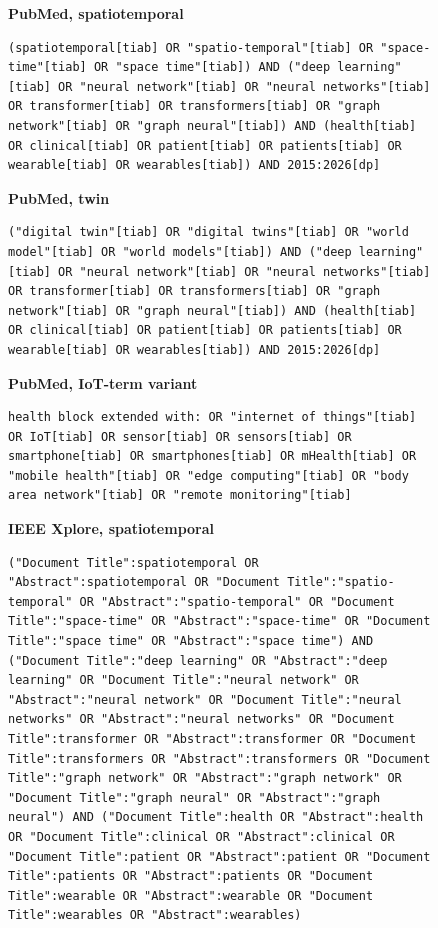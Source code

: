 \documentclass[journal]{IEEEtran}
\begin{document}
\begin{figure}[tp]
\centering
\begin{minipage}{\textwidth}
\footnotesize
\textbf{PubMed, spatiotemporal}
\begin{lstlisting}
(spatiotemporal[tiab] OR "spatio-temporal"[tiab] OR "space-time"[tiab] OR "space time"[tiab]) AND ("deep learning"[tiab] OR "neural network"[tiab] OR "neural networks"[tiab] OR transformer[tiab] OR transformers[tiab] OR "graph network"[tiab] OR "graph neural"[tiab]) AND (health[tiab] OR clinical[tiab] OR patient[tiab] OR patients[tiab] OR wearable[tiab] OR wearables[tiab]) AND 2015:2026[dp]
\end{lstlisting}
\textbf{PubMed, twin}
\begin{lstlisting}
("digital twin"[tiab] OR "digital twins"[tiab] OR "world model"[tiab] OR "world models"[tiab]) AND ("deep learning"[tiab] OR "neural network"[tiab] OR "neural networks"[tiab] OR transformer[tiab] OR transformers[tiab] OR "graph network"[tiab] OR "graph neural"[tiab]) AND (health[tiab] OR clinical[tiab] OR patient[tiab] OR patients[tiab] OR wearable[tiab] OR wearables[tiab]) AND 2015:2026[dp]
\end{lstlisting}
\textbf{PubMed, IoT-term variant}
\begin{lstlisting}
health block extended with: OR "internet of things"[tiab] OR IoT[tiab] OR sensor[tiab] OR sensors[tiab] OR smartphone[tiab] OR smartphones[tiab] OR mHealth[tiab] OR "mobile health"[tiab] OR "edge computing"[tiab] OR "body area network"[tiab] OR "remote monitoring"[tiab]
\end{lstlisting}
\textbf{IEEE Xplore, spatiotemporal}
\begin{lstlisting}
("Document Title":spatiotemporal OR "Abstract":spatiotemporal OR "Document Title":"spatio-temporal" OR "Abstract":"spatio-temporal" OR "Document Title":"space-time" OR "Abstract":"space-time" OR "Document Title":"space time" OR "Abstract":"space time") AND ("Document Title":"deep learning" OR "Abstract":"deep learning" OR "Document Title":"neural network" OR "Abstract":"neural network" OR "Document Title":"neural networks" OR "Abstract":"neural networks" OR "Document Title":transformer OR "Abstract":transformer OR "Document Title":transformers OR "Abstract":transformers OR "Document Title":"graph network" OR "Abstract":"graph network" OR "Document Title":"graph neural" OR "Abstract":"graph neural") AND ("Document Title":health OR "Abstract":health OR "Document Title":clinical OR "Abstract":clinical OR "Document Title":patient OR "Abstract":patient OR "Document Title":patients OR "Abstract":patients OR "Document Title":wearable OR "Abstract":wearable OR "Document Title":wearables OR "Abstract":wearables)

\end{lstlisting}
\end{minipage}
\end{figure}
\end{document}
